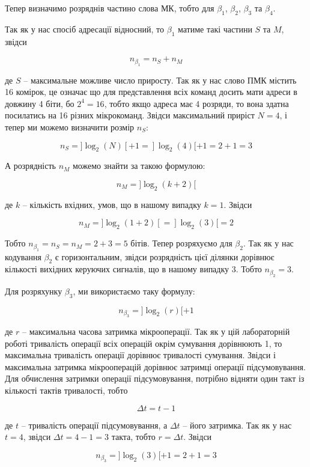 \documentclass[12pt,a4paper]{article}
\begin{document}
    \noindent
    Тепер визначимо розряднів частино слова МК, тобто для $\beta_1$, $\beta_2$, $\beta_3$ та $\beta_4$.

    Так як у нас спосіб адресації відносний, то $\beta_1$ матиме такі частини $S$ та $M$, звідси

    \[
    n_{\beta_1} = n_S + n_M
    \]

    де $S$ -- максимальне можливе число приросту. Так як у нас слово ПМК містить 16 комірок, це означає що для представлення всіх команд досить мати адреси в довжину 4 біти, бо $2^4 = 16$, тобто якщо адреса має 4 розряди, то вона здатна посилатись на 16 різних мікрокоманд. Звідси максимальний приріст $N = 4$, і тепер ми можемо визначити розмір $n_S$:

    \[
    n_S = ]\log_2(N)[ + 1 = ]\log_2(4)[ + 1 = 2 + 1 = 3
    \]

    А розрядність $n_M$ можемо знайти за такою формулою:

    \[
    n_M = ] \log_2(k+2) [
    \]

    де $k$ -- кількість вхідних, умов, що в нашому випадку $k=1$. Звідси

    \[
    n_M = ] \log_2(1+2) [ = ] \log_2(3) [ = 2
    \]

    Тобто $n_{\beta_1} = n_S = n_M = 2 + 3 = 5$ бітів. Тепер розряхуємо для $\beta_2$. Так як у нас кодування $\beta_2$ є горизонтальним, звідси розрядність цієї ділянки дорівнює кількості вихідних керуючих сигналів, що в нашому випадку 3. Тобто $n_{\beta_2} = 3$.

    Для розряхунку $\beta_3$, ми використаємо таку формулу:

    \[
    n_{\beta_3} =]\log_2(r)[+1
    \]

    де $r$ -- максимальна часова затримка мікрооперації. Так як у цій лабораторній роботі тривалість операції всіх операцій окрім сумування дорівнюють 1, то максимальна тривалість операції дорівнює тривалості сумування. Звідси і максимальна затримка мікрооперацій дорівнює затримці операції підсумовування. Для обчислення затримки операції підсумовування, потрібно відняти один такт із кількості тактів тривалості, тобто
    
    \[
    \Delta t = t - 1
    \]

    де $t$ -- тривалість операції підсумовування, а $\Delta t$ -- його затримка. Так як у нас $t = 4$, звідси $\Delta t = 4 - 1 = 3$ такта, тобто $r = \Delta t$. Звідси
    
    \[
    n_{\beta_3} =] \log_2(3)[ +1 = 2+1 = 3 
    \]
\end{document}
